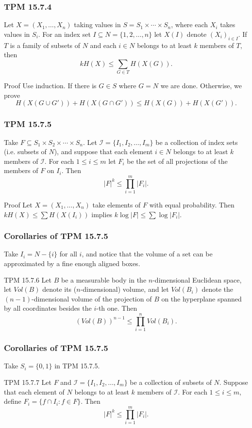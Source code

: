 \documentclass{beamer}
\begin{document}
\begin{frame}
  \frametitle{TPM 15.7.4}
  Let $X = (X_1, \dotsc, X_n)$ taking values in $S = S_1 \times \dotsb \times S_n$, where each $X_i$ takes values in $S_i$. For an index set $I \subseteq N = \{ 1, 2, \dotsc, n \}$ let $X(I)$ denote $(X_i)_{i \in I}$. If $T$ is a family of subsets of $N$ and each $i \in N$ belongs to at least $k$ members of $T$, then \[ kH(X) \le \sum_{G \in T} H(X(G)). \]

  \begin{block}{Proof}
    Use induction. If there is $G \in S$ where $G = N$ we are done. Otherwise, we prove \[ H(X(G \cup G')) + H(X(G \cap G')) \le H(X(G)) + H(X(G')). \]
  \end{block}
\end{frame}

\begin{frame}
  \frametitle{TPM 15.7.5}
  Take $F \subseteq S_1 \times S_2 \times \dotsb \times S_n$. Let $\mathcal{I} = \{ I_1, I_2, \dotsc, I_m \}$ be a collection of index sets (i.e. subsets of $N$), and suppose that each element $i \in N$ belongs to at least $k$ members of $\mathcal{I}$. For each $1 \le i \le m$ let $F_i$ be the set of all projections of the members of $F$ on $I_i$. Then \[ |F|^k \le \prod_{i = 1}^m |F_i|. \]

  \begin{block}{Proof}
    Let $X = (X_1, \dotsc, X_n)$ take elements of $F$ with equal probability. Then $kH(X) \le \sum H(X(I_i))$ implies $k \log |F| \le \sum \log |F_i|$.
  \end{block}
\end{frame}

\begin{frame}
  \frametitle{Corollaries of TPM 15.7.5}
  Take $I_i = N - \{ i \}$ for all $i$, and notice that the volume of a set can be approximated by a fine enough aligned boxes.
  \begin{block}{TPM 15.7.6}
    Let $B$ be a measurable body in the $n$-dimensional Euclidean space, let $Vol(B)$ denote its ($n$-dimensional) volume, and let $Vol(B_i)$ denote the $(n - 1)$-dimensional volume of the projection of $B$ on the hyperplane spanned by all coordinates besides the $i$-th one. Then \[ (Vol(B))^{n - 1} \le \prod_{i = 1}^n Vol(B_i). \]
  \end{block}
\end{frame}

\begin{frame}
  \frametitle{Corollaries of TPM 15.7.5}
  Take $S_i = \{ 0, 1 \}$ in TPM 15.7.5.
  \begin{block}{TPM 15.7.7}
    Let $F$ and $\mathcal{I} = \{ I_1, I_2, \dotsc, I_m \}$ be a collection of subsets of $N$. Suppose that each element of $N$ belongs to at least $k$ members of $\mathcal{I}$. For each $1 \le i \le m$, define $F_i = \{ f \cap I_i : f \in F \}.$ Then \[ |F|^k \le \prod_{i = 1}^m |F_i|. \]
  \end{block}
\end{frame}
\end{document}
